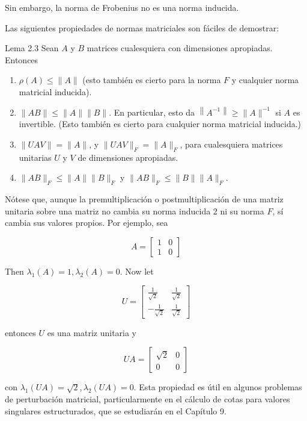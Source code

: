 \documentclass[11pt]{article}
\begin{document}
Sin embargo, la norma de Frobenius no es una norma inducida.

Las siguientes propiedades de normas matriciales son fáciles de demostrar:

Lema 2.3 Sean $A$ y $B$ matrices cualesquiera con dimensiones apropiadas. Entonces

\begin{enumerate}
  \item $\rho(A) \leq\|A\|$ (esto también es cierto para la norma $F$ y cualquier norma matricial inducida).
  \item $\|A B\| \leq\|A\|\|B\|$. En particular, esto da $\left\|A^{-1}\right\| \geq\|A\|^{-1}$ si $A$ es invertible. (Esto también es cierto para cualquier norma matricial inducida.)
  \item $\|U A V\|=\|A\|$, y $\|U A V\|_{F}=\|A\|_{F}$, para cualesquiera matrices unitarias $U$ y $V$ de dimensiones apropiadas.
  \item $\|A B\|_{F} \leq\|A\|\|B\|_{F}$ y $\|A B\|_{F} \leq\|B\|\|A\|_{F}$.
\end{enumerate}

Nótese que, aunque la premultiplicación o postmultiplicación de una matriz unitaria sobre una matriz no cambia su norma inducida 2 ni su norma $F$, sí cambia sus valores propios. Por ejemplo, sea

$$
A=\left[\begin{array}{ll}
1 & 0 \\
1 & 0
\end{array}\right]
$$

Then $\lambda_{1}(A)=1, \lambda_{2}(A)=0$. Now let

$$
U=\left[\begin{array}{cc}
\frac{1}{\sqrt{2}} & \frac{1}{\sqrt{2}} \\
-\frac{1}{\sqrt{2}} & \frac{1}{\sqrt{2}}
\end{array}\right]
$$

entonces $U$ es una matriz unitaria y

$$
U A=\left[\begin{array}{cc}
\sqrt{2} & 0 \\
0 & 0
\end{array}\right]
$$

con $\lambda_{1}(U A)=\sqrt{2}, \lambda_{2}(U A)=0$. Esta propiedad es útil en algunos problemas de perturbación matricial, particularmente en el cálculo de cotas para valores singulares estructurados, que se estudiarán en el Capítulo 9.
\end{document}
